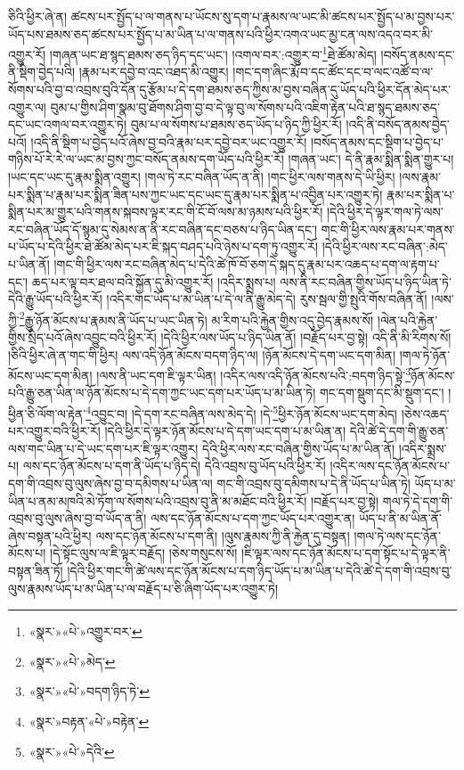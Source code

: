 ཅིའི་ཕྱིར་ཞེ་ན། ཚངས་པར་སྤྱོད་པ་ལ་གནས་པ་ཡོངས་སུ་དག་པ་རྣམས་ལ་ཡང་མི་ཚངས་པར་སྤྱོད་པ་མ་བྱས་པར་ཡོད་པས་ཐམས་ཅད་ཚངས་པར་སྤྱོད་པ་མ་ཡིན་པ་ལ་གནས་པའི་ཕྱིར་འགའ་ཡང་མྱ་ངན་ལས་འདའ་བར་མི་འགྱུར་རོ། །གཞན་ཡང་ཐ་སྙད་ཐམས་ཅད་ཉིད་དང་ཡང་། །འགལ་བར་:འགྱུར་བ་\footnote{«སྣར་»«པེ་»འགྱུར་བར་}ཐེ་ཚོམ་མེད། །བསོད་ནམས་དང་ནི་སྡིག་བྱེད་པའི། །རྣམ་པར་དབྱེ་བ་འང་འཐད་མི་འགྱུར། །གང་དག་ཞིང་རྨོ་བ་དང་ཚོང་དང་བ་ལང་འཚོ་བ་ལ་སོགས་པའི་བྱ་བ་འབྲས་བུའི་དོན་དུ་རྩོམ་པ་དེ་དག་ཐམས་ཅད་ཀྱིས་མ་བྱས་བཞིན་དུ་ཡོད་པའི་ཕྱིར་དོན་མེད་པར་འགྱུར་ལ། བུམ་པ་གྱིས་ཤིག་སྣམ་བུ་ཐོགས་ཤིག་བྱ་བ་དེ་ལྟ་བུ་ལ་སོགས་པའི་འཇིག་རྟེན་པའི་ཐ་སྙད་ཐམས་ཅད་དང་ཡང་འགལ་བར་འགྱུར་ཏེ། བུམ་པ་ལ་སོགས་པ་ཐམས་ཅད་ཡོད་པ་ཉིད་ཀྱི་ཕྱིར་རོ། །འདི་ནི་བསོད་ནམས་བྱེད་པའོ། །འདི་ནི་སྡིག་པ་བྱེད་པའོ་ཞེས་བྱ་བའི་རྣམ་པར་དབྱེ་བར་ཡང་འགྱུར་རོ། །བསོད་ནམས་དང་སྡིག་པ་བྱེད་པ་གཉིས་པོ་རེ་རེ་ལ་ཡང་མ་བྱས་ཀྱང་བསོད་ནམས་དག་ཡོད་པའི་ཕྱིར་རོ། །གཞན་ཡང་། དེ་ནི་རྣམ་སྨིན་སྨིན་གྱུར་པ། །ཡང་དང་ཡང་དུ་རྣམ་སྨིན་འགྱུར། །གལ་ཏེ་རང་བཞིན་ཡོད་ན་ནི། །གང་ཕྱིར་ལས་གནས་དེ་ཡི་ཕྱིར། །ལས་རྣམ་པར་སྨིན་པ་རྣམ་པར་སྨིན་ཟིན་པས་ཀྱང་ཡང་དང་ཡང་དུ་རྣམ་པར་སྨིན་པ་འབྱིན་པར་འགྱུར་ཏེ། རྣམ་པར་སྨིན་པ་སྨིན་པར་མ་གྱུར་པའི་གནས་སྐབས་ལྟར་རང་གི་ངོ་བོ་ལས་མ་ཉམས་པའི་ཕྱིར་རོ། །དེའི་ཕྱིར་དེ་ལྟར་གལ་ཏེ་ལས་རང་བཞིན་ཡོད་དོ་སྙམ་དུ་སེམས་ན་ནི་རང་བཞིན་དང་བཅས་པ་ཉིད་ཡིན་དང་། གང་གི་ཕྱིར་ལས་རྣམ་པར་གནས་པ་ཡོད་པ་དེའི་ཕྱིར་ཐེ་ཚོམ་མེད་པར་ཇི་སྐད་བཤད་པའི་ཉེས་པ་དག་ཏུ་འགྱུར་རོ། །དེའི་ཕྱིར་ལས་རང་བཞིན་:མེད་པ་ཡིན་ནོ། །གང་གི་ཕྱིར་ལས་རང་བཞིན་མེད་པ་དེའི་ཚེ་ཁོ་བོ་ཅག་དེ་སྐད་དུ་རྣམ་པར་འཆད་པ་དག་ལ་རྟག་པ་དང་། ཆད་པར་ལྟ་བར་ཐལ་བའི་སྐྱོན་དུ་མི་འགྱུར་རོ། །འདིར་སྨྲས་པ། ལས་ནི་རང་བཞིན་གྱིས་ཡོད་པ་ཉིད་ཡིན་ཏེ་དེའི་རྒྱུ་ཡོད་པའི་ཕྱིར་རོ། །འདིར་གང་ཡོད་པ་མ་ཡིན་པ་དེ་ལ་ནི་རྒྱུ་མེད་དེ། རུས་སྦལ་གྱི་སྤུའི་གོས་བཞིན་ནོ། །ལས་ཀྱི་\footnote{«སྣར་»«པེ་»མེད་}རྒྱུ་ཉོན་མོངས་པ་རྣམས་ནི་ཡོད་པ་ཡང་ཡིན་ཏེ། མ་རིག་པའི་རྐྱེན་གྱིས་འདུ་བྱེད་རྣམས་སོ། །ལེན་པའི་རྐྱེན་གྱིས་སྲིད་པའོ་ཞེས་འབྱུང་བའི་ཕྱིར་རོ། །དེའི་ཕྱིར་ལས་ཡོད་པ་ཉིད་ཡིན་ནོ། །བརྗོད་པར་བྱ་སྟེ། འདི་ནི་མི་རིགས་སོ། །ཅིའི་ཕྱིར་ཞེ་ན་གང་གི་ཕྱིར། ལས་འདི་ཉོན་མོངས་བདག་ཉིད་ལ། །ཉོན་མོངས་དེ་དག་ཡང་དག་མིན། །གལ་ཏེ་ཉོན་མོངས་ཡང་དག་མིན། །ལས་ནི་ཡང་དག་ཇི་ལྟར་ཡིན། །འདིར་ལས་འདི་ཉོན་མོངས་པའི་:བདག་ཉིད་སྟེ་\footnote{«སྣར་»«པེ་»བདག་ཉིད་ཏེ་}ཉོན་མོངས་པའི་རྒྱུ་ཅན་ཡིན་ལ་ཉོན་མོངས་པ་དེ་དག་ཀྱང་ཡང་དག་པར་ཡོད་པ་མ་ཡིན་ཏེ། གང་དག་སྡུག་དང་མི་སྡུག་དང་། །ཕྱིན་ཅི་ལོག་ལ་རྟེན་\footnote{«སྣར་»བརྟན་«པེ་»བརྟེན་}འབྱུང་བ། །དེ་དག་རང་བཞིན་ལས་མེད་དེ། །དེ་\footnote{«སྣར་»«པེ་»དེའི་}ཕྱིར་ཉོན་མོངས་ཡང་དག་མེད། །ཅེས་འཆད་པར་འགྱུར་བའི་ཕྱིར་རོ། །དེའི་ཕྱིར་དེ་ལྟར་ཉོན་མོངས་པ་དེ་དག་ཡང་དག་པ་མ་ཡིན་ན། དེའི་ཚེ་དེ་དག་གི་རྒྱུ་ཅན་ལས་གང་ཡིན་པ་དེ་ཡང་དག་པར་ཇི་ལྟར་འགྱུར། དེའི་ཕྱིར་ལས་རང་བཞིན་གྱིས་ཡོད་པ་མ་ཡིན་ནོ། །འདིར་སྨྲས་པ། ལས་དང་ཉོན་མོངས་པ་དག་ནི་ཡོད་པ་ཉིད་དེ། དེའི་འབྲས་བུ་ཡོད་པའི་ཕྱིར་རོ། །འདིར་ལས་དང་ཉོན་མོངས་པ་དག་གི་འབྲས་བུ་ལུས་ཞེས་བྱ་བ་དམིགས་པ་ཡིན་ལ། གང་གི་འབྲས་བུ་དམིགས་པ་དེ་ནི་ཡོད་པ་ཡིན་ཏེ། ཡོད་པ་མ་ཡིན་པ་ནམ་མཁའི་མེ་ཏོག་ལ་སོགས་པའི་འབྲས་བུ་ནི་མ་མཐོང་བའི་ཕྱིར་རོ། །བརྗོད་པར་བྱ་སྟེ། གལ་ཏེ་དེ་དག་གི་འབྲས་བུ་ལུས་ཞེས་བྱ་བ་ཡོད་ན་ནི། ལས་དང་ཉོན་མོངས་པ་དག་ཀྱང་ཡོད་པར་འགྱུར་ན། ཡོད་པ་ནི་མ་ཡིན་ནོ་ཞེས་བསྟན་པའི་ཕྱིར། ལས་དང་ཉོན་མོངས་པ་དག་ནི། །ལུས་རྣམས་ཀྱི་ནི་རྐྱེན་དུ་བསྟན། །གལ་ཏེ་ལས་དང་ཉོན་མོངས་པ། །དེ་སྟོང་ལུས་ལ་ཇི་ལྟར་བརྗོད། །ཅེས་གསུངས་སོ། །ཇི་ལྟར་ལས་དང་ཉོན་མོངས་པ་དག་སྟོང་པ་དེ་ལྟར་ནི་བསྟན་ཟིན་ཏོ། །དེའི་ཕྱིར་གང་གི་ཚེ་ལས་དང་ཉོན་མོངས་པ་དག་ཉིད་ཡོད་པ་མ་ཡིན་པ་དེའི་ཚེ་དེ་དག་གི་འབྲས་བུ་ལུས་རྣམས་ཡོད་པ་མ་ཡིན་པ་ལ་བརྗོད་པ་ཅི་ཞིག་ཡོད་པར་འགྱུར་ཏེ། 